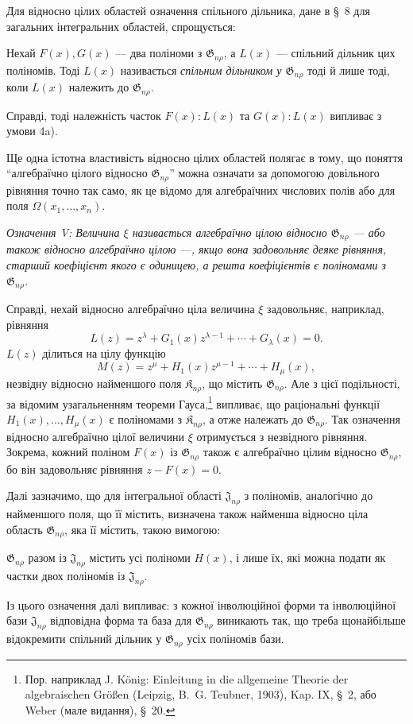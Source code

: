 \documentclass[11pt]{article}
\providecommand{\Kfield}{\mathfrak{K}}
\providecommand{\Jdom}{\mathfrak{J}}
\providecommand{\Gdom}{\mathfrak{G}}
\begin{document}
Для відносно цілих областей означення спільного дільника, дане в \S\ 8 для загальних інтегральних областей, спрощується:

Нехай $F(x),G(x)$ --- два поліноми з $\Gdom_{n\rho}$, а $L(x)$ --- спільний дільник цих поліномів. Тоді $L(x)$ називається \emph{спільним дільником у $\Gdom_{n\rho}$} тоді й лише тоді, коли $L(x)$ належить до $\Gdom_{n\rho}$.

Справді, тоді належність часток $F(x):L(x)$ та $G(x):L(x)$ випливає з умови 4a).

Ще одна істотна властивість відносно цілих областей полягає в тому, що поняття ``алгебраїчно цілого відносно $\Gdom_{n\rho}$'' можна означати за допомогою довільного рівняння точно так само, як це відомо для алгебраїчних числових полів або для поля $\Omega(x_1,\ldots,x_n)$.

\emph{Означення V: Величина $\xi$ називається алгебраїчно цілою відносно $\Gdom_{n\rho}$ --- або також відносно алгебраїчно цілою ---, якщо вона задовольняє деяке рівняння, старший коефіцієнт якого є одиницею, а решта коефіцієнтів є поліномами з $\Gdom_{n\rho}$.}

Справді, нехай відносно алгебраїчно ціла величина $\xi$ задовольняє, наприклад, рівняння
\[
  L(z)=z^\lambda+G_1(x)z^{\lambda-1}+\cdots+G_\lambda(x)=0.
\]
$L(z)$ ділиться на цілу функцію
\[
  M(z)=z^\mu+H_1(x)z^{\mu-1}+\cdots+H_\mu(x),
\]
незвідну відносно найменшого поля $\Kfield_{n\rho}$, що містить $\Gdom_{n\rho}$. Але з цієї подільності, за відомим узагальненням теореми Гауса,\footnote{Пор. наприклад J. König: Einleitung in die allgemeine Theorie der algebraischen Größen (Leipzig, B.~G. Teubner, 1903), Kap. IX, \S\ 2, або Weber (мале видання), \S\ 20.} випливає, що раціональні функції $H_1(x),\ldots,H_\mu(x)$ є поліномами з $\Kfield_{n\rho}$, а отже належать до $\Gdom_{n\rho}$. Так означення відносно алгебраїчно цілої величини $\xi$ отримується з незвідного рівняння. Зокрема, кожний поліном $F(x)$ із $\Gdom_{n\rho}$ також є алгебраїчно цілим відносно $\Gdom_{n\rho}$, бо він задовольняє рівняння $z-F(x)=0$.

Далі зазначимо, що для інтегральної області $\Jdom_{n\rho}$ з поліномів, аналогічно до найменшого поля, що її містить, визначена також найменша відносно ціла область $\Gdom_{n\rho}$, яка її містить, такою вимогою:

$\Gdom_{n\rho}$ разом із $\Jdom_{n\rho}$ містить усі поліноми $H(x)$, і лише їх, які можна подати як частки двох поліномів із $\Jdom_{n\rho}$.

Із цього означення далі випливає: з кожної інволюційної форми та інволюційної бази $\Jdom_{n\rho}$ відповідна форма та база для $\Gdom_{n\rho}$ виникають так, що треба щонайбільше відокремити спільний дільник у $\Gdom_{n\rho}$ усіх поліномів бази.
\end{document}
